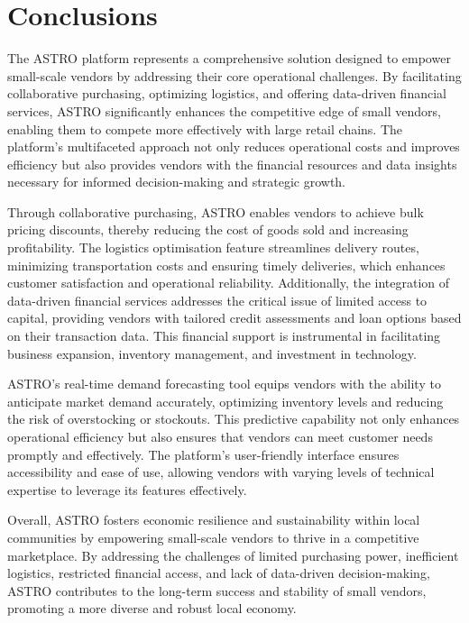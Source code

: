 \chapter{Conclusions}

The ASTRO platform represents a comprehensive solution designed to empower small-scale vendors by addressing their core operational challenges. By facilitating collaborative purchasing, optimizing logistics, and offering data-driven financial services, ASTRO significantly enhances the competitive edge of small vendors, enabling them to compete more effectively with large retail chains. The platform's multifaceted approach not only reduces operational costs and improves efficiency but also provides vendors with the financial resources and data insights necessary for informed decision-making and strategic growth.

Through collaborative purchasing, ASTRO enables vendors to achieve bulk pricing discounts, thereby reducing the cost of goods sold and increasing profitability. The logistics optimisation feature streamlines delivery routes, minimizing transportation costs and ensuring timely deliveries, which enhances customer satisfaction and operational reliability. Additionally, the integration of data-driven financial services addresses the critical issue of limited access to capital, providing vendors with tailored credit assessments and loan options based on their transaction data. This financial support is instrumental in facilitating business expansion, inventory management, and investment in technology.

ASTRO's real-time demand forecasting tool equips vendors with the ability to anticipate market demand accurately, optimizing inventory levels and reducing the risk of overstocking or stockouts. This predictive capability not only enhances operational efficiency but also ensures that vendors can meet customer needs promptly and effectively. The platform's user-friendly interface ensures accessibility and ease of use, allowing vendors with varying levels of technical expertise to leverage its features effectively.

Overall, ASTRO fosters economic resilience and sustainability within local communities by empowering small-scale vendors to thrive in a competitive marketplace. By addressing the challenges of limited purchasing power, inefficient logistics, restricted financial access, and lack of data-driven decision-making, ASTRO contributes to the long-term success and stability of small vendors, promoting a more diverse and robust local economy.

